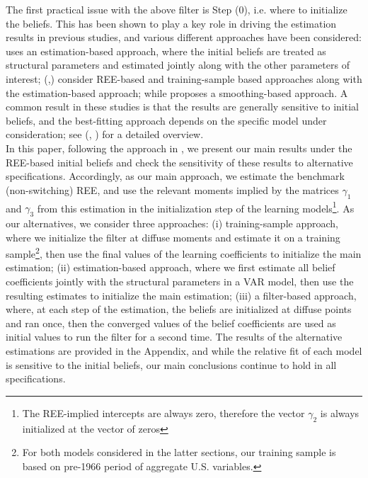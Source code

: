\documentclass[12pt,reqno]{article}
\numberwithin{equation}{section}
\begin{document}
The first practical issue with the above filter is Step (0), i.e. where to initialize the beliefs. This has been shown to play a key role in driving the estimation results in previous studies, and various different approaches have been considered: \cite{milani2007expectations} uses an estimation-based approach, where the initial beliefs are treated as structural parameters and estimated jointly along with the other parameters of interest; \citeauthor{slobodyan2012alearning} (\citeyear{slobodyan2012alearning},\citeyear{slobodyan2012blearning}) consider REE-based and training-sample based approaches along with the estimation-based approach; while \cite{berardi2017smoothing} proposes a smoothing-based approach. A common result in these studies is that  the results are generally sensitive to initial beliefs, and the best-fitting approach depends on the specific model under consideration; see \citeauthor{berardi2017empirical} (\citeyear{berardi2017empirical}, \citeyear{berardi2017initialization}) for a detailed overview. \\
\noindent
In this paper, following the approach in \cite{slobodyan2012alearning}, we present our main results under the REE-based initial beliefs and check the sensitivity of these results to alternative specifications. Accordingly, as our main approach, we estimate the benchmark (non-switching) REE, and use the relevant moments implied by the matrices $\gamma_1$ and $\gamma_3$ from this estimation in the initialization step  of the learning models\footnote{The REE-implied intercepts are always zero, therefore the vector $\gamma_2$ is always initialized at the vector of zeros}. As our alternatives, we consider three approaches: (i) training-sample approach, where we initialize the filter at diffuse moments and estimate it on a training sample\footnote{For both models considered in the latter sections, our training sample is based on pre-1966 period of aggregate U.S. variables.}, then use the final values of the learning coefficients to initialize the main estimation; (ii) estimation-based approach, where we first estimate all belief coefficients jointly with the structural parameters in a VAR model, then use the resulting estimates to initialize the main estimation; (iii) a filter-based approach, where, at each step of the estimation, the beliefs are initialized at diffuse points and ran once, then the converged values of the belief coefficients are used as initial values to run the filter for a second time. The results of the alternative estimations are provided in the Appendix, and while the relative fit of each model is sensitive to the initial beliefs, our main conclusions continue to hold in all specifications. 
\end{document}
